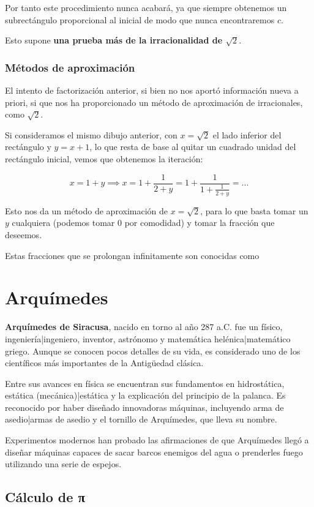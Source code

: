 \documentclass{apuntes}
\begin{document}
Por tanto este procedimiento nunca acabará, ya que siempre obtenemos un subrectángulo proporcional al inicial de modo que nunca encontraremos $c$.

Esto supone \textbf{una prueba más de la irracionalidad de $\sqrt{2}$}.

\subsubsection{Métodos de aproximación}
El intento de factorización anterior, si bien no nos aportó información nueva a priori, si que nos ha proporcionado un método de aproximación de irracionales, como $\sqrt{2}$.

Si consideramos el mismo dibujo anterior, con $x = \sqrt{2}$ el lado inferior del rectángulo y $y=x+1$, lo que resta de base al quitar un cuadrado unidad del rectángulo inicial, vemos que obtenemos la iteración:

\[x = 1+y \implies x = 1 + \frac{1}{2+y} = 1 + \frac{1}{1 + \frac{1}{2+y}} = ... \]

Esto nos da un método de aproximación de $x=\sqrt{2}$, para lo que basta tomar un $y$ cualquiera (podemos tomar 0 por comodidad) y tomar la fracción que deseemos. 

Estas fracciones que se prolongan infinitamente son conocidas como 

\section{Arquímedes}
\textbf{Arquímedes de Siracusa}, nacido en torno al año 287 a.C. fue un físico, ingeniería|ingeniero, inventor, astrónomo y matemática helénica|matemático griego. Aunque se conocen pocos detalles de su vida, es considerado uno de los científicos más importantes de la Antigüedad clásica. 

Entre sus avances en física se encuentran sus fundamentos en hidrostática, estática (mecánica)|estática y la explicación del principio de la palanca. Es reconocido por haber diseñado innovadoras máquinas, incluyendo arma de asedio|armas de asedio y el tornillo de Arquímedes, que lleva su nombre. 

Experimentos modernos han probado las afirmaciones de que Arquímedes llegó a diseñar máquinas capaces de sacar barcos enemigos del agua o prenderles fuego utilizando una serie de espejos. 


\subsection{Cálculo de π}
\end{document}

